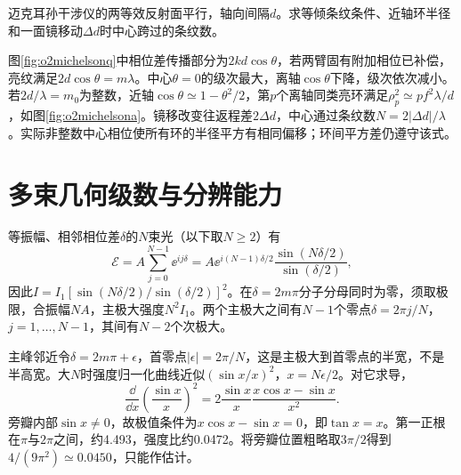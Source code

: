 \begin{example}\label{ex:o2michelson}
迈克耳孙干涉仪的两等效反射面平行，轴向间隔$d$。求等倾条纹条件、近轴环半径和一面镜移动$\Delta d$时中心跨过的条纹数。
\end{example}
\begin{solution}
图\ref{fig:o2michelsonq}中相位差传播部分为$2kd\cos\theta$，若两臂固有附加相位已补偿，亮纹满足$2d\cos\theta=m\lambda$。中心$\theta=0$的级次最大，离轴$\cos\theta$下降，级次依次减小。
若$2d/\lambda=m_0$为整数，近轴$\cos\theta\simeq1-\theta^2/2$，第$p$个离轴同类亮环满足$\rho_p^2\simeq pf^2\lambda/d$，如图\ref{fig:o2michelsona}。镜移改变往返程差$2\Delta d$，中心通过条纹数$N=2|\Delta d|/\lambda$。实际非整数中心相位使所有环的半径平方有相同偏移；环间平方差仍遵守该式。
\end{solution}

\section{多束几何级数与分辨能力}\label{th:o2multiple}
等振幅、相邻相位差$\delta$的$N$束光（以下取$N\geq2$）有
\[
 \mathcal E=A\sum_{j=0}^{N-1}\ee^{ij\delta}
 =A\ee^{i(N-1)\delta/2}\frac{\sin(N\delta/2)}{\sin(\delta/2)},
\]
因此$I=I_1[\sin(N\delta/2)/\sin(\delta/2)]^2$。在$\delta=2m\pi$分子分母同时为零，须取极限，合振幅$NA$，主极大强度$N^2I_1$。两个主极大之间有$N-1$个零点$\delta=2\pi j/N$，$j=1,\ldots,N-1$，其间有$N-2$个次极大。

主峰邻近令$\delta=2m\pi+\epsilon$，首零点$|\epsilon|=2\pi/N$，这是主极大到首零点的半宽，不是半高宽。大$N$时强度归一化曲线近似$(\sin x/x)^2$，$x=N\epsilon/2$。对它求导，
\[
 \frac{\dd}{\dd x}\left(\frac{\sin x}{x}\right)^2
 =2\frac{\sin x}{x}\frac{x\cos x-\sin x}{x^2}.
\]
旁瓣内部$\sin x\ne0$，故极值条件为$x\cos x-\sin x=0$，即$\tan x=x$。第一正根在$\pi$与$2\pi$之间，约4.493，强度比约0.0472。将旁瓣位置粗略取$3\pi/2$得到$4/(9\pi^2)\simeq0.0450$，只能作估计。

